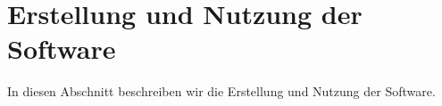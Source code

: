 
\chapter{Erstellung und Nutzung der Software}
\label{cha:erstellung}
In diesen Abschnitt beschreiben wir die Erstellung und Nutzung der
Software. 



